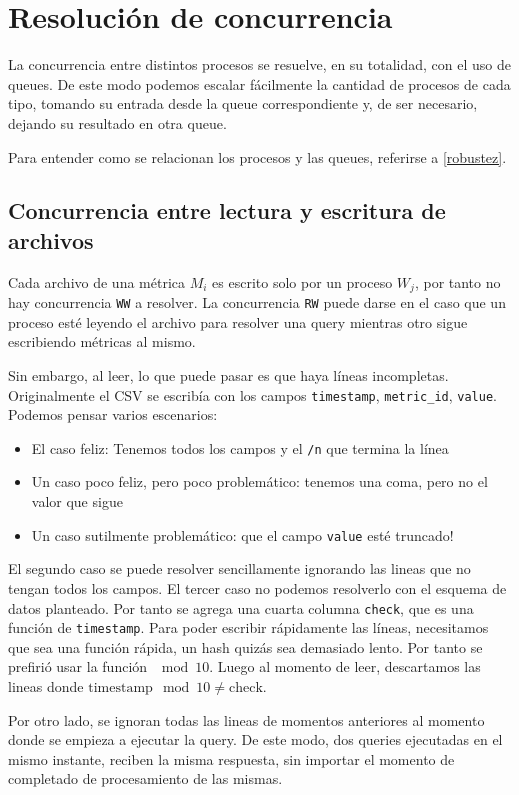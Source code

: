 \documentclass[titlepage,a4paper,oneside]{article}
\begin{document}
\section{Resolución de concurrencia}
La concurrencia entre distintos procesos se resuelve, en su totalidad, con el uso de queues. De este modo podemos escalar fácilmente la cantidad de procesos de cada tipo, tomando su entrada desde la queue correspondiente y, de ser necesario, dejando su resultado en otra queue.

Para entender como se relacionan los procesos y las queues, referirse a \ref{robustez}.

\subsection{Concurrencia entre lectura y escritura de archivos}
Cada archivo de una métrica $M_i$ es escrito solo por un proceso $W_j$, por tanto no hay concurrencia \texttt{WW} a resolver. La concurrencia \texttt{RW} puede darse en el caso que un proceso esté leyendo el archivo para resolver una query mientras otro sigue escribiendo métricas al mismo.

Sin embargo, al leer, lo que puede pasar es que haya líneas incompletas. Originalmente el CSV se escribía con los campos \texttt{timestamp}, \texttt{metric\_id}, \texttt{value}. Podemos pensar varios escenarios:
\begin{itemize}
	\item El caso feliz: Tenemos todos los campos y el \texttt{\slash n} que termina la línea
	\item Un caso poco feliz, pero poco problemático: tenemos una coma, pero no el valor que sigue
	\item Un caso sutilmente problemático: que el campo \texttt{value} esté truncado!
\end{itemize}

El segundo caso se puede resolver sencillamente ignorando las lineas que no tengan todos los campos. El tercer caso no podemos resolverlo con el esquema de datos planteado. Por tanto se agrega una cuarta columna \texttt{check}, que es una función de \texttt{timestamp}. Para poder escribir rápidamente las líneas, necesitamos que sea una función rápida, un hash quizás sea demasiado lento. Por tanto se prefirió usar la función $\mod 10$. Luego al momento de leer, descartamos las lineas donde $\text{timestamp} \mod 10 \neq \text{check}$.

Por otro lado, se ignoran todas las lineas de momentos anteriores al momento donde se empieza a ejecutar la query. De este modo, dos queries ejecutadas en el mismo instante, reciben la misma respuesta, sin importar el momento de completado de procesamiento de las mismas.

\printbibliography
\end{document}
